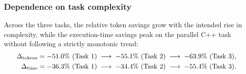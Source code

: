 \documentclass[aps,onecolumn,10pt,superscriptaddress,floatfix,nofootinbib]{revtex4}
\begin{document}
\subsubsection{Dependence on task complexity}
Across the three tasks, the relative token savings grow with the intended rise in complexity, while the execution-time savings peak on the parallel C++ task without following a strictly monotonic trend:
\begin{align}
\Delta_{\text{tokens}} &= -51.0\% \text{ (Task 1)} \;\longrightarrow\; -55.1\% \text{ (Task 2)} \;\longrightarrow\; -63.9\% \text{ (Task 3)}, \notag \\
\Delta_{\text{time}}   &= -36.3\% \text{ (Task 1)} \;\longrightarrow\; -34.4\% \text{ (Task 2)} \;\longrightarrow\; -55.4\% \text{ (Task 3)}. \notag
\end{align}
\end{document}
